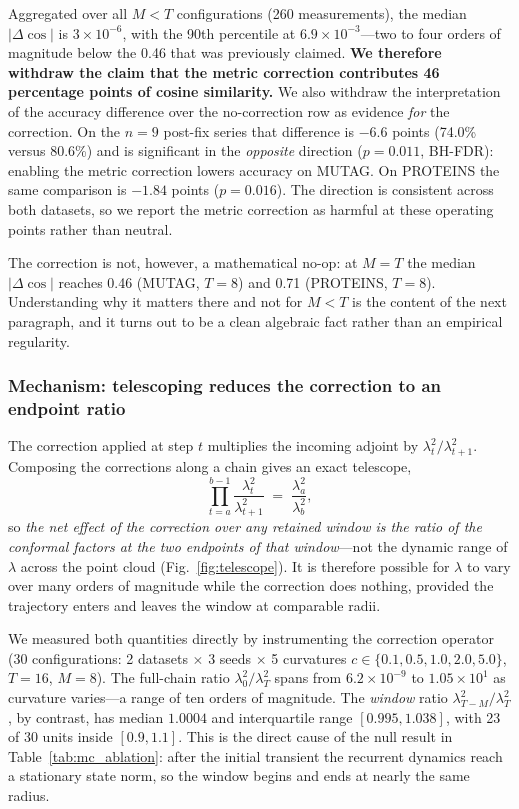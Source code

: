 \documentclass[a4paper,fleqn]{cas-dc}
\begin{document}
Aggregated over all $M<T$ configurations (260 measurements), the median $|\Delta\cos|$ is $3\times10^{-6}$, with the 90th percentile at $6.9\times10^{-3}$---two to four orders of magnitude below the 0.46 that was previously claimed. \textbf{We therefore withdraw the claim that the metric correction contributes 46 percentage points of cosine similarity.} We also withdraw the interpretation of the accuracy difference over the no-correction row as evidence \emph{for} the correction. On the $n{=}9$ post-fix series that difference is $-6.6$ points (74.0\% versus 80.6\%) and is significant in the \emph{opposite} direction ($p{=}0.011$, BH-FDR): enabling the metric correction lowers accuracy on MUTAG. On PROTEINS the same comparison is $-1.84$ points ($p{=}0.016$). The direction is consistent across both datasets, so we report the metric correction as harmful at these operating points rather than neutral.

The correction is not, however, a mathematical no-op: at $M=T$ the median $|\Delta\cos|$ reaches 0.46 (MUTAG, $T{=}8$) and 0.71 (PROTEINS, $T{=}8$). Understanding why it matters there and not for $M<T$ is the content of the next paragraph, and it turns out to be a clean algebraic fact rather than an empirical regularity.

\subsubsection{Mechanism: telescoping reduces the correction to an endpoint ratio}

The correction applied at step $t$ multiplies the incoming adjoint by $\lambda_t^2/\lambda_{t+1}^2$. Composing the corrections along a chain gives an exact telescope,
\[
\prod_{t=a}^{b-1}\frac{\lambda_t^2}{\lambda_{t+1}^2} \;=\; \frac{\lambda_a^2}{\lambda_b^2},
\]
so \emph{the net effect of the correction over any retained window is the ratio of the conformal factors at the two endpoints of that window}---not the dynamic range of $\lambda$ across the point cloud (Fig.~\ref{fig:telescope}). It is therefore possible for $\lambda$ to vary over many orders of magnitude while the correction does nothing, provided the trajectory enters and leaves the window at comparable radii.

We measured both quantities directly by instrumenting the correction operator (30 configurations: 2 datasets $\times$ 3 seeds $\times$ 5 curvatures $c\in\{0.1,0.5,1.0,2.0,5.0\}$, $T{=}16$, $M{=}8$). The full-chain ratio $\lambda_0^2/\lambda_T^2$ spans from $6.2\times10^{-9}$ to $1.05\times10^{1}$ as curvature varies---a range of ten orders of magnitude. The \emph{window} ratio $\lambda_{T-M}^2/\lambda_T^2$, by contrast, has median $1.0004$ and interquartile range $[0.995, 1.038]$, with 23 of 30 units inside $[0.9,1.1]$. This is the direct cause of the null result in Table~\ref{tab:mc_ablation}: after the initial transient the recurrent dynamics reach a stationary state norm, so the window begins and ends at nearly the same radius.
\end{document}
